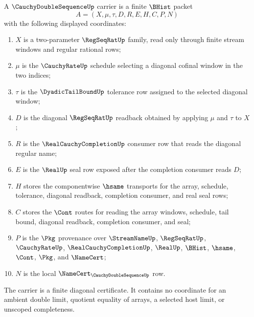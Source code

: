 \begin{definition}\label{def:cauchy-double-sequence-carrier}
A $\CauchyDoubleSequenceUp$ carrier is a finite $\BHist$ packet
$$
A=(X,\mu,\tau,D,R,E,H,C,P,N)
$$
with the following displayed coordinates:
\begin{enumerate}
\item $X$ is a two-parameter $\RegSeqRatUp$ family, read only through finite stream windows and regular rational rows;
\item $\mu$ is the $\CauchyRateUp$ schedule selecting a diagonal cofinal window in the two indices;
\item $\tau$ is the $\DyadicTailBoundUp$ tolerance row assigned to the selected diagonal window;
\item $D$ is the diagonal $\RegSeqRatUp$ readback obtained by applying $\mu$ and $\tau$ to $X$;
\item $R$ is the $\RealCauchyCompletionUp$ consumer row that reads the diagonal regular name;
\item $E$ is the $\RealUp$ seal row exposed after the completion consumer reads $D$;
\item $H$ stores the componentwise $\hsame$ transports for the array, schedule, tolerance, diagonal readback, completion consumer, and real seal rows;
\item $C$ stores the $\Cont$ routes for reading the array windows, schedule, tail bound, diagonal readback, completion consumer, and seal;
\item $P$ is the $\Pkg$ provenance over $\StreamNameUp$, $\RegSeqRatUp$, $\CauchyRateUp$, $\RealCauchyCompletionUp$, $\RealUp$, $\BHist$, $\hsame$, $\Cont$, $\Pkg$, and $\NameCert$;
\item $N$ is the local $\NameCert_{\CauchyDoubleSequenceUp}$ row.
\end{enumerate}
The carrier is a finite diagonal certificate. It contains no coordinate for an ambient double limit, quotient equality of arrays, a selected host limit, or unscoped completeness.
\end{definition}

